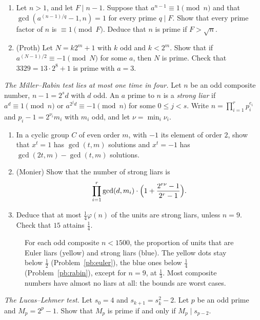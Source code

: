 \begin{exercise}[$\star\star$]\label{pb:pocklington}
\begin{enumerate}[label=(\alph*)]
\item Let $n>1$, and let $F\mid n-1$. Suppose that $a^{n-1}\equiv1\pmod n$ and that $\gcd(a^{(n-1)/q}-1,n)=1$ for every prime
$q\mid F$. Show that every prime factor of $n$ is $\equiv1\pmod F$. Deduce that $n$ is prime if $F>\sqrt n$.
\item (Proth) Let $N=k2^m+1$ with $k$ odd and $k<2^m$. Show that if $a^{(N-1)/2}\equiv-1\pmod N$ for some $a$, then $N$ is
prime. Check that $3329=13\cdot2^8+1$ is prime with $a=3$.
\end{enumerate}
\end{exercise}

\begin{exercise}[Journey]\label{pb:rabin}
\emph{The Miller--Rabin test lies at most one time in four.} Let $n$ be an odd composite number, $n-1=2^sd$ with $d$ odd.
An $a$ prime to $n$ is a \emph{strong liar} if $a^d\equiv1\pmod n$ or $a^{2^jd}\equiv-1\pmod n$ for some $0\le j<s$. Write
$n=\prod_{i=1}^rp_i^{e_i}$ and $p_i-1=2^{\nu_i}m_i$ with $m_i$ odd, and let $\nu=\min_i\nu_i$.
\begin{enumerate}[label=(\alph*)]
\item In a cyclic group $C$ of even order $m$, with $-1$ its element of order $2$, show that $x^t=1$ has $\gcd(t,m)$
solutions and $x^t=-1$ has $\gcd(2t,m)-\gcd(t,m)$ solutions.
\item (Monier) Show that the number of strong liars is
\[
\prod_{i=1}^r\gcd(d,m_i)\cdot\Bigl(1+\frac{2^{r\nu}-1}{2^r-1}\Bigr).
\]
\item Deduce that at most $\frac14\varphi(n)$ of the units are strong liars, unless $n=9$. Check that $15$ attains $\frac14$.
\end{enumerate}
\end{exercise}

\begin{figure}[ht]
\centering
{}
\caption{For each odd composite $n<1500$, the proportion of units that are Euler liars (yellow) and strong liars (blue). The
yellow dots stay below $\frac12$ (Problem~\ref{pb:euler}), the blue ones below $\frac14$ (Problem~\ref{pb:rabin}), except for
$n=9$, at $\frac13$. Most composite numbers have almost no liars at all: the bounds are worst cases.}
\label{fig:liars}
\end{figure}

\begin{exercise}[$\star\star\star$]\label{pb:lucaslehmer}
\emph{The Lucas--Lehmer test.} Let $s_0=4$ and $s_{k+1}=s_k^2-2$. Let $p$ be an odd prime and $M_p=2^p-1$. Show that $M_p$
is prime if and only if $M_p\mid s_{p-2}$.
\end{exercise}

